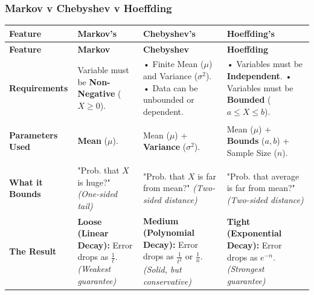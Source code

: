 \documentclass[../Probability.tex]{subfiles}
\begin{document}
\subsubsection{Markov v Chebyshev v Hoeffding}
\begin{longtable}{ 
    >{\bfseries}p{2.5cm} 
    p{4.5cm} 
    p{4.5cm} 
    p{4.5cm} 
}
\toprule
\textbf{Feature} & \textbf{Markov's} & \textbf{Chebyshev's} & \textbf{Hoeffding's} \\
\midrule
\endfirsthead

\toprule
\textbf{Feature} & \textbf{Markov} & \textbf{Chebyshev} & \textbf{Hoeffding} \\
\midrule
\endhead

\bottomrule
\endfoot

\textbf{Requirements} \newline  & 
Variable must be \textbf{Non-Negative} ($X \ge 0$). & 
• Finite Mean ($\mu$) and Variance ($\sigma^2$). \newline
• Data can be unbounded or dependent. & 
• Variables must be \textbf{Independent}. \newline
• Variables must be \textbf{Bounded} ($a \le X \le b$). \\
\midrule

\textbf{Parameters Used} \newline & 
\textbf{Mean} ($\mu$). & 
Mean ($\mu$) + \textbf{Variance} ($\sigma^2$). & 
Mean ($\mu$) + \textbf{Bounds} ($a, b$) + Sample Size ($n$). \\
\midrule

\textbf{What it Bounds} \newline & 
"Prob. that $X$ is huge?" \newline
\textit{(One-sided tail)} & 
"Prob. that $X$ is far from mean?" \newline
\textit{(Two-sided distance)} & 
"Prob. that average is far from mean?" \newline
\textit{(Two-sided distance)} \\
\midrule

\textbf{The Result} \newline & 
\textbf{Loose (Linear Decay):} \newline
Error drops as $\frac{1}{t}$. \newline
\textit{(Weakest guarantee)} & 
\textbf{Medium (Polynomial Decay):} \newline
Error drops as $\frac{1}{t^2}$ or $\frac{1}{n}$. \newline
\textit{(Solid, but conservative)} & 
\textbf{Tight (Exponential Decay):} \newline
Error drops as $e^{-n}$. \newline
\textit{(Strongest guarantee)} \\
\midrule


\end{longtable}
\end{document}
